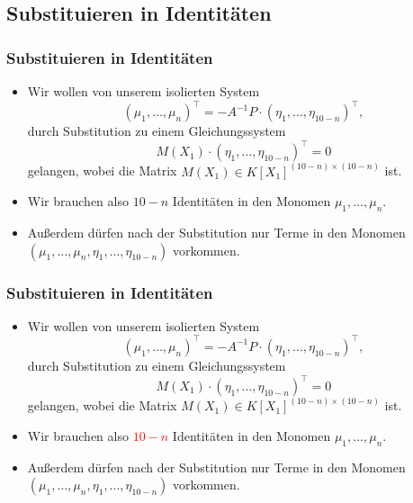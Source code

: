 \documentclass[11pt]{beamer}
\theoremstyle{custom}
\theoremstyle{custom}
\begin{document}
	\subsection*{Substituieren in Identitäten}
	\begin{frame}
		\frametitle{Substituieren in Identitäten}
		\begin{itemize}
			\item Wir wollen von unserem isolierten System
			\begin{equation*}\label{eqn:cub_inv_eqs}
				\left(\mu_1,\ldots,\mu_n\right)^{\top} = -A^{-1} P \cdot \left(\eta_1,\ldots,\eta_{10-n}\right)^{\top},
			\end{equation*}
			durch Substitution zu einem Gleichungssystem
			\begin{equation*}
				M(X_1) \cdot \left(\eta_1,\ldots,\eta_{10-n} \right)^{\top} = 0
			\end{equation*}
			gelangen, wobei die Matrix $M(X_1) \in K[X_1]^{(10-n) \times (10-n)}$ ist.
			\item Wir brauchen also $10-n$ Identitäten in den Monomen $\mu_1,\ldots,\mu_n$.
			\item Außerdem dürfen nach der Substitution nur Terme in den Monomen $\left(\mu_1,\ldots,\mu_n,\eta_1,\ldots,\eta_{10-n}\right)$ vorkommen.
		\end{itemize}
	\end{frame}
	\begin{frame}
		\frametitle{Substituieren in Identitäten}
		\begin{itemize}
			\item Wir wollen von unserem isolierten System
			\begin{equation*}\label{eqn:cub_inv_eqs}
				\left(\mu_1,\ldots,\mu_n\right)^{\top} = -A^{-1} P \cdot \left(\eta_1,\ldots,\eta_{10-n}\right)^{\top},
			\end{equation*}
			durch Substitution zu einem Gleichungssystem
			\begin{equation*}
				M(X_1) \cdot \left(\eta_1,\ldots,\eta_{10-n} \right)^{\top} = 0
			\end{equation*}
			gelangen, wobei die Matrix $M(X_1) \in K[X_1]^{(10-n) \times (10-n)}$ ist.
				\item Wir brauchen also \textcolor{red}{$10-n$} Identitäten in den Monomen $\mu_1,\ldots,\mu_n$.
				\item Außerdem dürfen nach der Substitution nur Terme in den Monomen $\left(\mu_1,\ldots,\mu_n,\eta_1,\ldots,\eta_{10-n}\right)$ vorkommen.
		\end{itemize}
		
	\end{frame}
\end{document}
